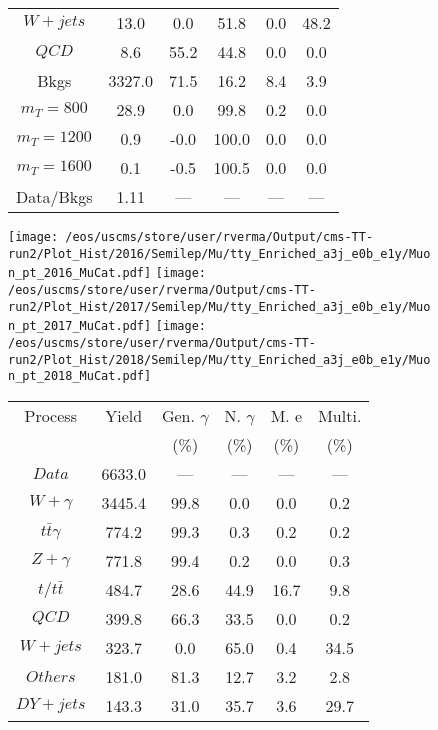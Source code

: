 \begin{figure}
\begin{minipage}[c]{0.32\textwidth}
{\begin{tabular}{cccccc}
$ W+jets $ &  13.0 &  0.0 &  51.8 &  0.0 &  48.2\\
$ QCD $ &  8.6 &  55.2 &  44.8 &  0.0 &  0.0\\
Bkgs &  3327.0 &  71.5 &  16.2 &  8.4 &  3.9\\
$ m_{T} = 800 $ &  28.9 &  0.0 &  99.8 &  0.2 &  0.0\\
$ m_{T} = 1200 $ &  0.9 &  -0.0 &  100.0 &  0.0 &  0.0\\
$ m_{T} = 1600 $ &  0.1 &  -0.5 &  100.5 &  0.0 &  0.0\\
Data/Bkgs &  1.11 &  --- &  --- &  --- &  ---\\
\hline
\end{tabular}
}
\end{minipage}
\end{figure}

\begin{figure}
\centering
\texttt{[image: /eos/uscms/store/user/rverma/Output/cms-TT-run2/Plot\_Hist/2016/Semilep/Mu/tty\_Enriched\_a3j\_e0b\_e1y/Muon\_pt\_2016\_MuCat.pdf]}
\texttt{[image: /eos/uscms/store/user/rverma/Output/cms-TT-run2/Plot\_Hist/2017/Semilep/Mu/tty\_Enriched\_a3j\_e0b\_e1y/Muon\_pt\_2017\_MuCat.pdf]}
\texttt{[image: /eos/uscms/store/user/rverma/Output/cms-TT-run2/Plot\_Hist/2018/Semilep/Mu/tty\_Enriched\_a3j\_e0b\_e1y/Muon\_pt\_2018\_MuCat.pdf]}
\begin{minipage}[c]{0.32\textwidth}
\centering
\tiny{
\begin{tabular}{cccccc}
\hline
Process & Yield & Gen. $\gamma$ & N. $\gamma$ & M. e & Multi. \\
 &  & (\%) & (\%) & (\%) & (\%)  \\
\hline
                                                                      $ Data $ &  6633.0 &  --- &  --- &  --- &  ---\\
$ W+\gamma $ &  3445.4 &  99.8 &  0.0 &  0.0 &  0.2\\
$ t\bar{t}\gamma $ &  774.2 &  99.3 &  0.3 &  0.2 &  0.2\\
$ Z+\gamma $ &  771.8 &  99.4 &  0.2 &  0.0 &  0.3\\
$ t/t\bar{t} $ &  484.7 &  28.6 &  44.9 &  16.7 &  9.8\\
$ QCD $ &  399.8 &  66.3 &  33.5 &  0.0 &  0.2\\
$ W+jets $ &  323.7 &  0.0 &  65.0 &  0.4 &  34.5\\
$ Others $ &  181.0 &  81.3 &  12.7 &  3.2 &  2.8\\
$ DY+jets $ &  143.3 &  31.0 &  35.7 &  3.6 &  29.7\\

\end{tabular}}
\end{minipage}
\end{figure}
